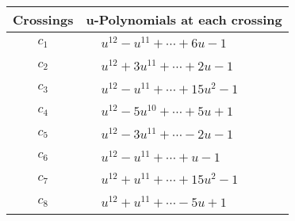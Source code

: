 \documentclass[1p]{elsarticle_modified}
\theoremstyle{definition}
\begin{document}
\begin{tabular}{m{50pt}|m{274pt}}
Crossings & \hspace{64pt}u-Polynomials at each crossing \\
\hline $$\begin{aligned}c_{1}\end{aligned}$$&$\begin{aligned}
&u^{12}- u^{11}+\cdots+6 u-1
\end{aligned}$\\
\hline $$\begin{aligned}c_{2}\end{aligned}$$&$\begin{aligned}
&u^{12}+3 u^{11}+\cdots+2 u-1
\end{aligned}$\\
\hline $$\begin{aligned}c_{3}\end{aligned}$$&$\begin{aligned}
&u^{12}- u^{11}+\cdots+15 u^2-1
\end{aligned}$\\
\hline $$\begin{aligned}c_{4}\end{aligned}$$&$\begin{aligned}
&u^{12}-5 u^{10}+\cdots+5 u+1
\end{aligned}$\\
\hline $$\begin{aligned}c_{5}\end{aligned}$$&$\begin{aligned}
&u^{12}-3 u^{11}+\cdots-2 u-1
\end{aligned}$\\
\hline $$\begin{aligned}c_{6}\end{aligned}$$&$\begin{aligned}
&u^{12}- u^{11}+\cdots+u-1
\end{aligned}$\\
\hline $$\begin{aligned}c_{7}\end{aligned}$$&$\begin{aligned}
&u^{12}+u^{11}+\cdots+15 u^2-1
\end{aligned}$\\
\hline $$\begin{aligned}c_{8}\end{aligned}$$&$\begin{aligned}
&u^{12}+u^{11}+\cdots-5 u+1
\end{aligned}$\\

\end{tabular}
\end{document}

